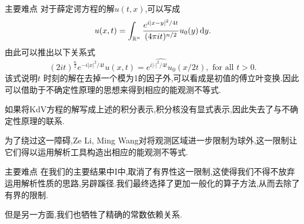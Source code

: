 \iffalse
\begin{frame}[t]
  Consider the following linear Korteweg-de Vries (KdV) equation
  \begin{equation}\label{3}
    \partial_t u +\partial_x^3u=0,\quad u(0,x)=u_0(x)\in L^2(\R).
  \end{equation}
  Our aim is to prove the observability inequality at two points in time as (\ref{obsch}) for (\ref{3}),

  i.e.,
  \begin{equation}\label{7}
    \int_{\R}|u_0(x)|^2\,\mathrm{d}x\le C \left( \int_{\R\setminus S}|u_0(x)|^2\,\mathrm{d}x + \int_{\R\setminus \Sigma} |u(t,x)|\,\mathrm{d}x  \right), 
  \end{equation}
  where $C$ is a constant depending on $t$ and finite sets $S$ and $\Sigma$. 
\end{frame}
\fi

\begin{frame}[t]{主要难点}
  对于薛定谔方程的解$u(t,x)$,可以写成
  \[
    u(x,t)=\int_{\mathbb{R}^{n}}\frac{e^{i|x-y|^2 /4t} }{(4\pi it)^{n /2}}u_0(y)\,\mathrm{d}y.
  \] 
  由此可以推出以下关系式
  \begin{equation}\label{rel}
    (2it)^{\frac{n}{2}}e^{-i|x|^2 /4t}u(x,t)=\widehat{e^{i|\cdot |^2 /4t}u_0}(x /2t), \text{ for all }t>0.
  \end{equation}
  该式说明$t$ 时刻的解在去掉一个模为1的因子外,可以看成是初值的傅立叶变换.因此可以借助于不确定性原理的思想来得到相应的能观测不等式.

如果将KdV方程的解写成上述的积分表示,积分核没有显式表示,因此失去了与不确定性原理的联系.

为了绕过这一障碍,Ze Li, Ming Wang对将观测区域进一步限制为球外,这一限制让它们得以运用解析工具构造出相应的能观测不等式.

\end{frame}
\begin{frame}[t]{主要难点}
  在我们的主要结果中I中,取消了有界性这一限制,这使得我们不得不放弃运用解析性质的思路,另辟蹊径.我们最终选择了更加一般化的算子方法,从而去除了有界的限制.

  但是另一方面,我们也牺牲了精确的常数依赖关系.
\end{frame}


